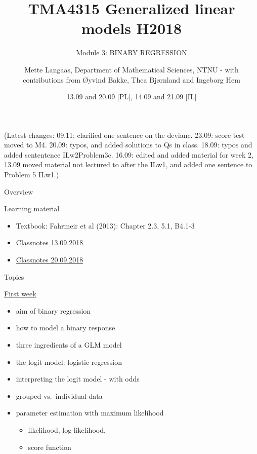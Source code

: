 \documentclass[
  ignorenonframetext,
]{beamer}
\title{TMA4315 Generalized linear models H2018}
\subtitle{Module 3: BINARY REGRESSION}
\author{Mette Langaas, Department of Mathematical Sciences, NTNU - with
contributions from Øyvind Bakke, Thea Bjørnland and Ingeborg Hem}
\date{13.09 and 20.09 {[}PL{]}, 14.09 and 21.09 {[}IL{]}}
\providecommand{\tightlist}{%
  \setlength{\itemsep}{0pt}\setlength{\parskip}{0pt}}
\begin{document}
\frame{\titlepage}

\begin{frame}
(Latest changes: 09.11: clarified one sentence on the devianc. 23.09:
score test moved to M4. 20.09: typos, and added solutions to Qs in
class. 18.09: typos and added sententence ILw2Problem3c. 16.09: edited
and added material for week 2, 13.09 moved material not lectured to
after the ILw1, and added one sentence to Problem 5 ILw1.)
\end{frame}

\begin{frame}{Overview}
\protect\hypertarget{overview}{}
\begin{block}{Learning material}
\protect\hypertarget{learning-material}{}
\begin{itemize}
\tightlist
\item
  Textbook: Fahrmeir et al (2013): Chapter 2.3, 5.1, B4.1-3
\item
  \href{https://www.math.ntnu.no/emner/TMA4315/2018h/TMA4315M3H20180913.pdf}{Classnotes
  13.09.2018}
\item
  \href{https://www.math.ntnu.no/emner/TMA4315/2018h/TMA4315M3H20180920.pdf}{Classnotes
  20.09.2018}
\end{itemize}
\end{block}
\end{frame}

\begin{frame}
\begin{block}{Topics}
\protect\hypertarget{topics}{}
\begin{block}{\protect\hyperlink{firstweek}{First week}}
\protect\hypertarget{first-week}{}
\begin{itemize}
\tightlist
\item
  aim of binary regression
\item
  how to model a binary response
\item
  three ingredients of a GLM model
\item
  the logit model: logistic regression
\item
  interpreting the logit model - with odds
\item
  grouped vs.~individual data
\item
  parameter estimation with maximum likelihood

  \begin{itemize}
  \tightlist
  \item
    likelihood, log-likelihood,
  \item
    score function
  \end{itemize}
\end{itemize}
\end{block}
\end{block}
\end{frame}
\end{document}
